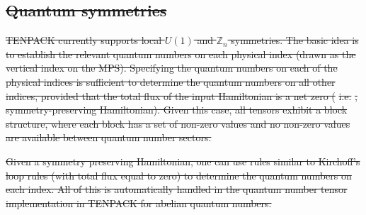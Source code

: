 \documentclass{juliacon}
\providecommand{\DIFdeltex}[1]{{\protect\color{red}\sout{#1}}}                      %
\providecommand{\DIFdel}[1]{\texorpdfstring{\DIFdeltex{#1}}{}} %
\begin{document}
\begin{appendix}
\section{\DIFdel{Quantum symmetries}}
\addtocounter{section}{-1}%

\DIFdel{TENPACK currently supports local $U(1)$ and $\mathbb{Z}_n$ symmetries. The basic idea is to establish the relevant quantum numbers on each physical index (drawn as the vertical index on the MPS). Specifying the quantum numbers on each of the physical indices is sufficient to determine the quantum numbers on all other indices, provided that the total flux of the input Hamiltonian is a net zero (}%
\DIFdel{i.e.}%
\DIFdel{, symmetry-preserving Hamiltonian). Given this case, all tensors exhibit a block structure, where each block has a set of non-zero values and no non-zero values are available between quantum number sectors.
}%

\DIFdel{Given a symmetry preserving Hamiltonian, one can use rules similar to Kirchoff's loop rules (with total flux equal to zero) to determine the quantum numbers on each index. All of this is automatically handled in the quantum number tensor implementation in TENPACK for abelian quantum numbers. 
}%


\end{appendix}
\end{document}
